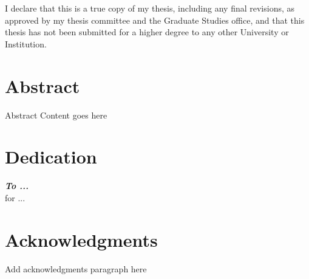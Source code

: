 I declare that this is a true copy of my thesis, including any final revisions, as approved by my thesis committee and the Graduate Studies office, and that this thesis has not been submitted for a higher degree to any other University or Institution.
\clearpage

\chapter*{Abstract}
{\doublespacing
	
Abstract Content goes here

}
\clearpage

\chapter*{Dedication}
\begin{center}
	\vspace{2cm}
	{\itshape\bfseries To ...}\\
	for ...
	\vfill
\end{center}
\clearpage

\chapter*{Acknowledgments}
Add acknowledgments paragraph here

\clearpage
\tableofcontents
\clearpage
\listoftables
{}
\clearpage
\listoffigures
{}
\clearpage
{}
\printglossary[type=\acronymtype,title=List of Abbreviations,toctitle=List of Abbreviations,nonumberlist]
\printglossary[type=symbols,title=List of Symbols,toctitle=List of Symbols,nonumberlist]
\printglossary[title=Glossary,toctitle=Glossary]
\clearpage
\mainmatter